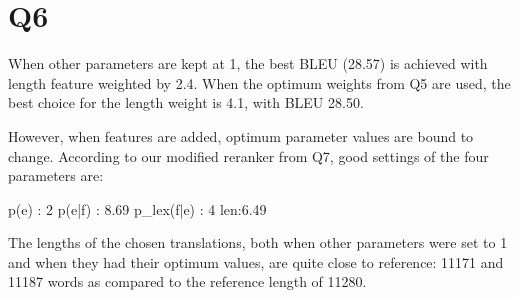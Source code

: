 \section*{Q6}
When other parameters are kept at 1, the best BLEU (28.57) is achieved with length feature weighted by 2.4. When the optimum weights from Q5 are used, the best choice for the length weight is 4.1, with BLEU 28.50.

However, when features are added, optimum parameter values are bound to change. According to our modified reranker from Q7, good settings of the four parameters are:
\centerline{p(e) : 2    p(e|f) : 8.69    p\_lex(f|e) : 4    len:6.49}

The lengths of the chosen translations, both when other parameters were set to 1 and when they had their optimum values, are quite close to reference: 11171 and 11187 words as compared to the reference length of 11280.

